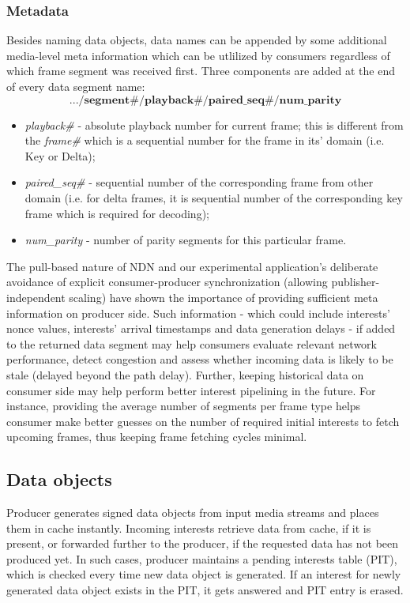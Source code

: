 \documentclass{icn/sig-alternate-2012} %
\begin{document}
\subsubsection{Metadata} 

Besides naming data objects, data names can be appended by some additional media-level meta information which can be utlilized by consumers regardless of which frame segment was received first. Three components are added at the end of every data segment name:
\small\begin{equation}
.../\textbf{segment\#}/\textbf{playback\#}/\textbf{paired\_seq\#}/\textbf{num\_parity} \nonumber
\end{equation}\normalsize
\begin{itemize}[label={}]
\item \textit{playback\#} - absolute playback number for current frame; this is different from the \textit{frame\#} which is a sequential number for the frame in its' domain (i.e. Key or Delta);
\item \textit{paired\_seq\#} - sequential number of the corresponding frame from other domain (i.e. for delta frames, it is sequential number of the corresponding key frame which is required for decoding);
\item \textit{num\_parity} - number of parity segments for this particular frame.
\end{itemize}

The pull-based nature of NDN and our experimental application's deliberate avoidance of explicit consumer-producer synchronization (allowing publisher-independent scaling) have shown the importance of providing sufficient meta information on producer side. Such information - which could include interests' nonce values, interests' arrival timestamps and data generation delays - if added to the returned data segment may help consumers evaluate relevant network performance, detect congestion and assess whether incoming data is likely to be stale (delayed beyond the path delay). Further, keeping historical data on consumer side may help perform better interest pipelining in the future. For instance, providing the average number of segments per frame type helps consumer make better guesses on the number of required initial interests to fetch upcoming frames, thus keeping frame fetching cycles minimal.


\subsection{Data objects}
Producer generates signed data objects from input media streams and places them in cache instantly. Incoming interests retrieve data from cache, if it is present, or forwarded further to the producer, if the requested data has not been produced yet. In such cases, producer maintains a pending interests table (PIT), which is checked every time new data object is generated. If an interest for newly generated data object exists in the PIT, it gets answered and PIT entry is erased.
\end{document}
